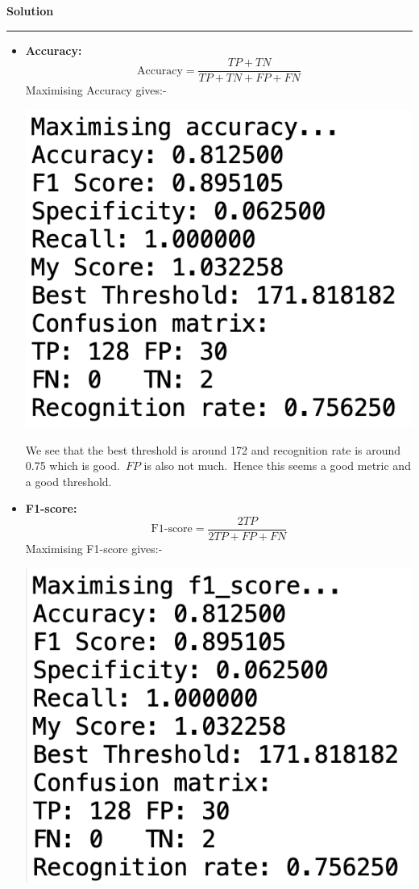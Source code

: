 \documentclass[a4paper,12pt]{article}
\newenvironment{solution}[2][]{%
    \begin{mdframed}[linecolor=blue!70!black, linewidth=2pt, roundcorner=10pt, backgroundcolor=yellow!10!white, skipabove=12pt, skipbelow=12pt]%
        \textbf{\large #2}
        \par\noindent\rule{\textwidth}{0.4pt}
}{
    \end{mdframed}
}
\begin{document}
\begin{solution}{Solution}
	\begin{itemize}
		\item \textbf{Accuracy:}
		\[
			\text{Accuracy} = \frac{TP+TN}{TP+TN+FP+FN}
		\]
		Maximising Accuracy gives:-
		\begin{center}
			\includegraphics[scale=0.5]{../images/accuracy.png}
		\end{center}
		We see that the best threshold is around 172 and recognition rate is around 0.75 which is good.\ $FP$ is also not much.\ Hence this seems a good metric and a good threshold.
		\item \textbf{F1-score:}
		\[
			\text{F1-score} = \frac{2TP}{2TP+FP+FN}
		\]
		Maximising F1-score gives:-
		\begin{center}
			\includegraphics[scale=0.5]{../images/f1-score.png}

\end{center}
\end{itemize}
\end{solution}
\end{document}
